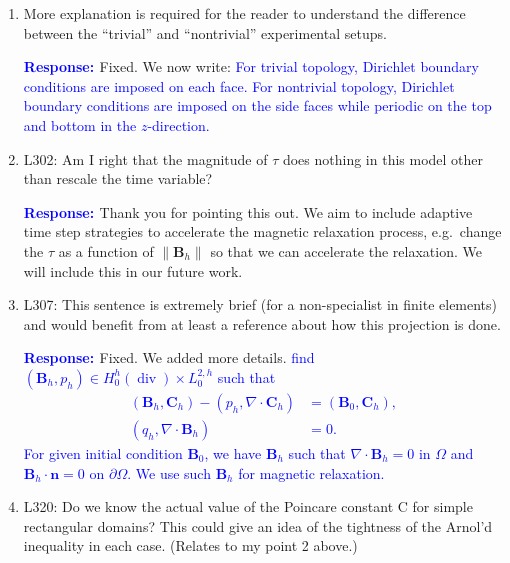 \documentclass{article}
\theoremstyle{definition}
\renewcommand\div{\operatorname{div}}
\newcommand{\rv}[1]{%
  \colorbox{gray!20}{%
    \parbox{0.96\linewidth}{%
      \small #1
    }%
  }%
}
\newcommand{\rp}{\textbf{\textcolor{blue}{Response: }}}
\newcommand{\blue}[1]{\textcolor{blue}{#1}}
\begin{document}
\begin{enumerate}
\rp Fixed. We have changed our notation: \begin{equation}
            |\Tilde{\mathcal{H}}|  \le  C^{-1}{\color{blue}\mathcal{E}}.
\end{equation}
where $\mathcal{E}=\|\bm B\|^2$. 

\item \rv{More explanation is required for the reader to understand the diﬀerence between
the “trivial” and “nontrivial” experimental setups.}

\rp Fixed. We now write: \blue{For trivial topology, Dirichlet boundary conditions are imposed on each face. For nontrivial topology, Dirichlet boundary conditions are imposed on the side faces while periodic on the top and bottom in the $z$-direction.}

\item \rv{L302: Am I right that the magnitude of $\tau$ does nothing in this model other than rescale
the time variable?}

\rp Thank you for pointing this out. We aim to include adaptive time step strategies to accelerate the magnetic relaxation process, e.g.~change the $\tau$ as a function of $\|\bm B_h\|$ so that we can accelerate the relaxation. We will include this in our future work. 

\item \rv{L307: This sentence is extremely brief (for a non-specialist in finite elements) and would
benefit from at least a reference about how this projection is done.}

\rp Fixed. We added more details. \blue{find $(\bm B_h, p_h)\in H_0^h(\div)\times L_0^{2,h}$ such that
\begin{subequations}
    \begin{align}
        (\bm B_h, \bm C_h) - (p_h, \nabla\cdot \bm C_h)&= (\bm B_0, \bm C_h), \\
        (q_h, \nabla\cdot \bm B_h)&=0.
    \end{align}
\end{subequations}
For given initial condition $\bm B_0$, we have $\bm B_h$ such that $\nabla\cdot \bm B_h=0$ in $\Omega$ and $\bm B_h\cdot\bm n=0$ on $\partial\Omega$. We use such $\bm B_h$ for magnetic relaxation.}

\item \rv{L320: Do we know the actual value of the Poincare constant C for simple rectangular
domains? This could give an idea of the tightness of the Arnol’d inequality in each case.
(Relates to my point 2 above.)}


\end{enumerate}
\end{document}
